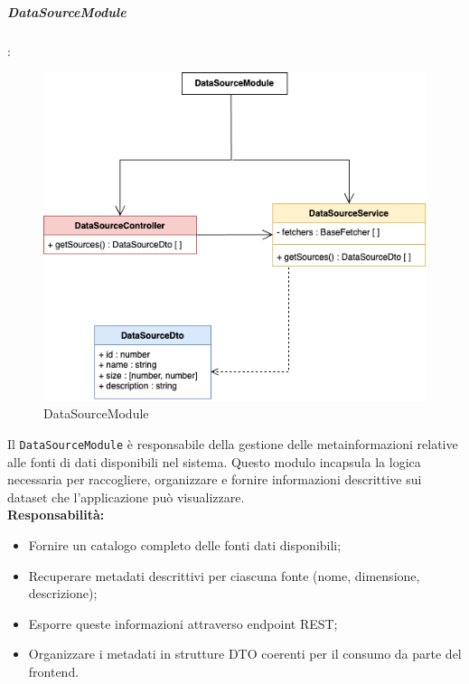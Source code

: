 \subparagraph{DataSourceModule}: 

\begin{figure}[H] 
    \centering
    \includegraphics[scale = 0.55]{template/images/uml_back/DataSourceModule.png}
    \caption{DataSourceModule}
\end{figure}

Il \texttt{DataSourceModule} è responsabile della gestione delle metainformazioni relative alle fonti di dati disponibili nel sistema. Questo modulo incapsula la logica necessaria per raccogliere, organizzare e fornire informazioni descrittive sui dataset che l'applicazione può visualizzare.\\

\textbf{Responsabilità:}
\begin{itemize}
    \item Fornire un catalogo completo delle fonti dati disponibili;
    \item Recuperare metadati descrittivi per ciascuna fonte (nome, dimensione, descrizione);
    \item Esporre queste informazioni attraverso endpoint REST;
    \item Organizzare i metadati in strutture DTO coerenti per il consumo da parte del frontend.
\end{itemize}

